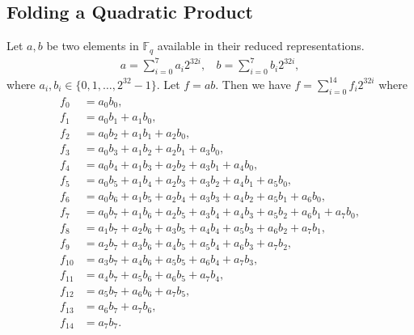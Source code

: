 \documentclass[a4paper, 12pt]{article}
\begin{document}
\subsection{Folding a Quadratic Product}%
\label{subsec:folding_a_quadratic_product}
Let $a,b$ be two elements in $\mathbb{F}_q$ available in their reduced representations.
\begin{align*}
  a = \sum^{7}_{i=0} a_i 2^{32i}, \ \ \ \ b = \sum^{7}_{i=0} b_i 2^{32i},
\end{align*}
where $a_i, b_i \in \{0,1,\ldots,2^{32}-1\}$.
Let $f = ab$. Then we have $f = \sum_{i=0}^{14} f_i 2^{32i}$ where
\begin{align*}
  f_0 & = a_0b_0,\\
  f_1 & = a_0b_1 + a_1b_0,\\
  f_2 & = a_0b_2 + a_1b_1 + a_2b_0,\\
  f_3 & = a_0b_3 + a_1b_2 + a_2b_1 + a_3b_0,\\
  f_4 & = a_0b_4 + a_1b_3 + a_2b_2 + a_3b_1 + a_4b_0,\\
  f_5 & = a_0b_5 + a_1b_4 + a_2b_3 + a_3b_2 + a_4b_1 + a_5b_0,\\
  f_6 & = a_0b_6 + a_1b_5 + a_2b_4 + a_3b_3 + a_4b_2 + a_5b_1 + a_6b_0,\\
  f_7 & = a_0b_7 + a_1b_6 + a_2b_5 + a_3b_4 + a_4b_3 + a_5b_2 + a_6b_1 + a_7b_0,\\
  f_8 & = a_1b_7 + a_2b_6 + a_3b_5 + a_4b_4 + a_5b_3 + a_6b_2 + a_7b_1,\\
  f_9 & = a_2b_7 + a_3b_6 + a_4b_5 + a_5b_4 + a_6b_3 + a_7b_2,\\
  f_{10} & = a_3b_7 + a_4b_6 + a_5b_5 + a_6b_4 + a_7b_3,\\
  f_{11} & = a_4b_7 + a_5b_6 + a_6b_5 + a_7b_4,\\
  f_{12} & = a_5b_7 + a_6b_6 + a_7b_5,\\
  f_{13} & = a_6b_7 + a_7b_6,\\
  f_{14} & = a_7b_7.
\end{align*}
\end{document}
